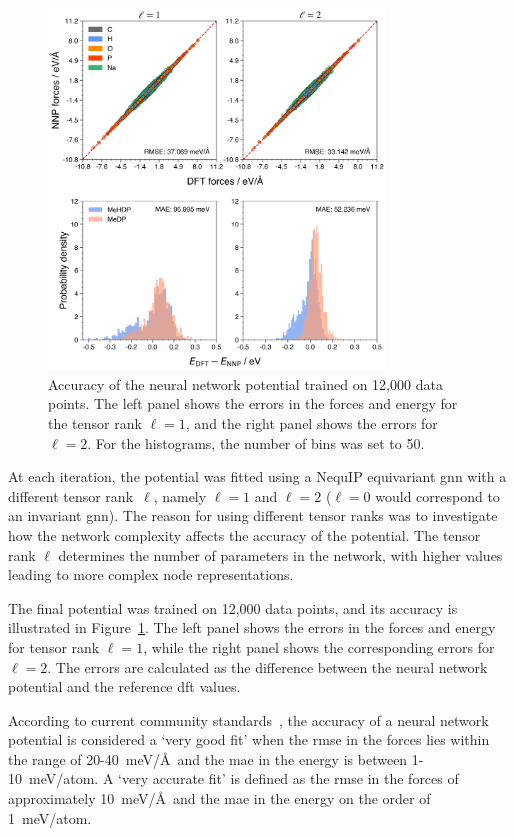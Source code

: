 \begin{figure}[t]
    \centering
    \includegraphics[width=0.8\textwidth]{Figures/4_Results/results_nnp_accuracy_l-1_l-2.png}
    \caption{Accuracy of the neural network potential trained on 12,000 data points. The left panel shows the errors in the forces and energy for the tensor rank $\ell=1$, and the right panel shows the errors for $\ell=2$. For the histograms, the number of bins was set to 50.}
    \label{fig:nnp_accuracy}
\end{figure}

At each iteration, the potential was fitted using a NequIP equivariant \ac{gnn} with a different tensor rank~$\ell$, namely $\ell=1$ and $\ell=2$ ($\ell=0$ would correspond to an invariant \ac{gnn}). The reason for using different tensor ranks was to investigate how the network complexity affects the accuracy of the potential. The tensor rank $\ell$ determines the number of parameters in the network, with higher values leading to more complex node representations.

The final potential was trained on 12,000 data points, and its accuracy is illustrated in Figure~\ref{fig:nnp_accuracy}. The left panel shows the errors in the forces and energy for tensor rank $\ell=1$, while the right panel shows the corresponding errors for $\ell=2$. The errors are calculated as the difference between the neural network potential and the reference \ac{dft} values.

According to current community standards~\citep{jacobsPracticalGuideMachine2025a}, the accuracy of a neural network potential is considered a `very good fit' when the \ac{rmse} in the forces lies within the range of 20-40~meV/\AA\ and the \ac{mae} in the energy is between 1-10~meV/atom. A `very accurate fit' is defined as the \ac{rmse} in the forces of approximately 10~meV/\AA\ and the \ac{mae} in the energy on the order of 1~meV/atom.

